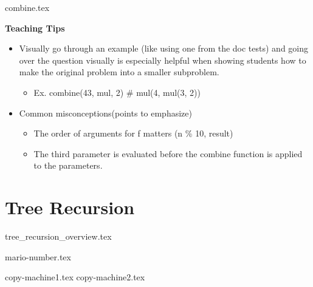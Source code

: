 \documentclass{exam}
\begin{document}
\begin{questions}
{combine.tex}
\begin{guide}
	\textbf{Teaching Tips}
	\begin{itemize}
	    \item Visually go through an example (like using one from the doc tests) and going over the question visually is especially helpful when showing students how to make the original problem into a smaller subproblem.
	    \begin{itemize}
			\item Ex. combine(43, mul, 2)  \# mul(4, mul(3, 2))
		\end{itemize}
	    \item Common misconceptions(points to emphasize)
	    \begin{itemize}
			\item The order of arguments for f matters (n \% 10, result)
			\item The third parameter is evaluated before the combine function is applied to the parameters. 
		\end{itemize}
	\end{itemize}
\end{guide}
\end{questions}

\pagebreak

\section{Tree Recursion}
{tree_recursion_overview.tex}
\pagebreak
\begin{questions}
{mario-number.tex}
\end{questions}
\begin{questions}
{copy-machine1.tex}
{copy-machine2.tex}
\end{questions}
\end{document}
